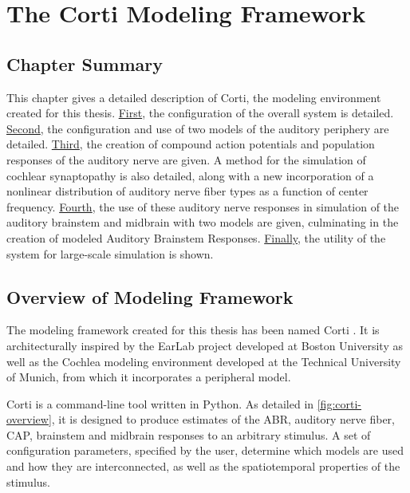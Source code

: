 \chapter{The Corti Modeling Framework}
\label{chapter:the_corti_modeling_framework}
\thispagestyle{myheadings}

\graphicspath{{4_Methods/Figures/}}

\section{Chapter Summary} %
\label{sec:methodsummary}
This chapter gives a detailed description of Corti, the modeling environment created for this thesis.  \hyperref[sec:overview_of_modeling_framework]{First}, the configuration of the overall system is detailed.  \hyperref[sec:peripheral_models]{Second}, the configuration and use of two models of the auditory periphery are detailed.  \hyperref[sec:auditory_nerve_response_models]{Third}, the creation of compound action potentials and population responses of the auditory nerve are given.  A method for the simulation of cochlear synaptopathy is also detailed, along with a new incorporation of a nonlinear distribution of auditory nerve fiber types as a function of center frequency.  \hyperref[sec:brainstem_models]{Fourth}, the use of these auditory nerve responses in simulation of the auditory brainstem and midbrain with two models are given, culminating in the creation of modeled Auditory Brainstem Responses.  \hyperref[sec:automated_parameter_exploration]{Finally}, the utility of the system for large-scale simulation is shown. 


\section{Overview of Modeling Framework} %
\label{sec:overview_of_modeling_framework}
The modeling framework created for this thesis has been named Corti \citep{Voysey2016Corti}. It is architecturally inspired by the EarLab project developed at Boston University as well as the Cochlea \citep{Rudnicki2014Cochlea} modeling environment developed at the Technical University of Munich, from which it incorporates a peripheral model.

Corti is a command-line tool written in Python. As detailed in \autoref{fig:corti-overview}, it is designed to produce estimates of the ABR, auditory nerve fiber, CAP, brainstem and midbrain responses to an arbitrary stimulus.  A set of configuration parameters, specified by the user, determine which models are used and how they are interconnected, as well as the spatiotemporal properties of the stimulus.

